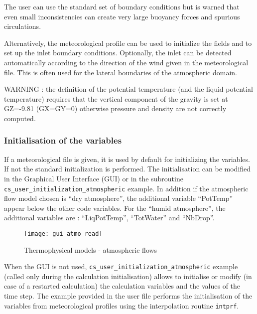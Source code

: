 {The user can  use the standard set of \CS boundary conditions but is warned that even small 
inconsistencies can create very large buoyancy forces and spurious circulations.

Alternatively, the meteorological profile can be used to initialize the fields and to set up the inlet boundary
conditions. Optionally, the inlet can be detected automatically according to the direction of the wind given 
in the meteorological file. This is often used for the lateral boundaries of the atmospheric domain.

WARNING : the definition of the potential temperature (and the liquid potential temperature) requires that the
vertical component of the gravity is set at GZ=-9.81 (GX=GY=0) otherwise pressure and density are not 
correctly computed.

\subsubsection{Initialisation of the variables}

If a meteorological file is given, it is used by default for initializing the
variables. If not the standard initialization is performed.
The initialisation can be modified in the Graphical User Interface (GUI)
 or in the subroutine \texttt{cs\_user\_initialization\_atmospheric} example.  
In addition if the atmospheric flow model chosen is
  ``dry atmosphere'',  the additional variable ``PotTemp'' appear below the other
code variables. For the ``humid atmosphere'', the additional variables are :
``LiqPotTemp'', ``TotWater'' and ``NbDrop''.

\begin{figure}[ht]
\begin{center}
\texttt{[image: gui\_atmo\_read]}
\caption{Thermophysical models - atmospheric flows}
\label{fig:Ini-atmo}
\end{center}
\end{figure}

When the GUI is not used, \texttt{cs\_user\_initialization\_atmospheric} example (called only during the calculation
 initialisation) allows to initialise or modify
(in case of a restarted calculation) the calculation variables and the values of
the time step. 
The example provided in the user file performs the initialisation of the 
variables from meteorological profiles using the interpolation routine \texttt{intprf}.

}
